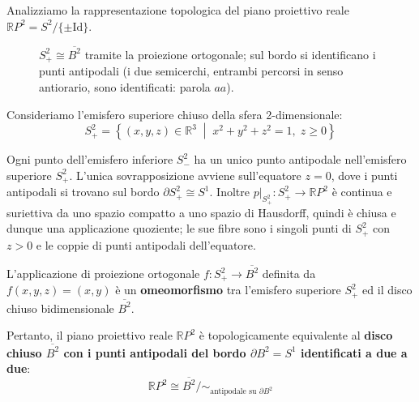 \begin{ejemplo}[Caso $n=2$: Il Piano Proiettivo Reale $\mathbb{R}P^2$]
Analizziamo la rappresentazione topologica del piano proiettivo reale $\mathbb{R}P^2 = S^2 / \{ \pm \mathrm{Id} \}$.

\begin{figure}[H]
    \centering
    \caption{$S^2_+ \cong \overline{B^2}$ tramite la proiezione ortogonale; sul bordo si identificano i punti antipodali (i due semicerchi, entrambi percorsi in senso antiorario, sono identificati: parola $aa$).}
\end{figure}

Consideriamo l'emisfero superiore chiuso della sfera 2-dimensionale:
\[
S^2_+ = \left\{ (x,y,z) \in \mathbb{R}^3 \;\middle|\; x^2 + y^2 + z^2 = 1, \; z \geqslant 0 \right\}
\]

Ogni punto dell'emisfero inferiore $S^2_-$ ha un unico punto antipodale nell'emisfero superiore $S^2_+$. L'unica sovrapposizione avviene sull'equatore $z=0$, dove i punti antipodali si trovano sul bordo $\partial S^2_+ \cong S^1$. Inoltre $p|_{S^2_+}: S^2_+ \to \mathbb{R}P^2$ \`e continua e suriettiva da uno spazio compatto a uno spazio di Hausdorff, quindi \`e chiusa e dunque una applicazione quoziente; le sue fibre sono i singoli punti di $S^2_+$ con $z>0$ e le coppie di punti antipodali dell'equatore.

L'applicazione di proiezione ortogonale $f: S^2_+ \to \overline{B^2}$ definita da $f(x,y,z) = (x,y)$ è un \textbf{omeomorfismo} tra l'emisfero superiore $S^2_+$ ed il disco chiuso bidimensionale $\overline{B^2}$.

Pertanto, il piano proiettivo reale $\mathbb{R}P^2$ è topologicamente equivalente al \textbf{disco chiuso $\overline{B^2}$ con i punti antipodali del bordo $\partial B^2 = S^1$ identificati a due a due}:
\[
\mathbb{R}P^2 \cong \overline{B^2} \big/ \sim_{\text{antipodale su } \partial B^2}
\]
\end{ejemplo}

